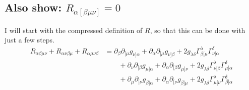 \subsection{Also show: $R_{\alpha[\beta\mu\nu]} = 0$}


\newcommand\rdef[4]{%
    \partial_#2 \partial_{[#3} g_{#4]#1}
    + \partial_#1 \partial_{[#3} g_{#4]#2}
    + 2 g_{\lambda\delta} \Gamma^\lambda_{#2[#3} \Gamma^\delta_{#4]#1}
}

I will start with the compressed definition of $R$, so that this can be done
with just a few steps.
\begin{align*}
    R_{\alpha\beta\mu\nu} + R_{\alpha\nu\beta\mu} + R_{\alpha\mu\nu\beta}
    &= \rdef\alpha\beta\mu\nu \\
    &\qquad
    + \rdef\alpha\nu\beta\mu \\
    &\qquad
    + \rdef\alpha\mu\nu\beta \\
\end{align*}

\IfFileExists{\bibliographyfile}{
    \printbibliography
}{}



